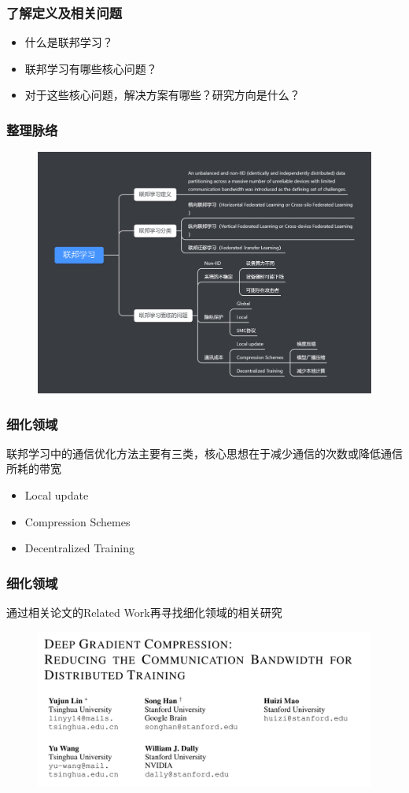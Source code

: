 \documentclass[hyperref={pdfpagelabels=false}]{beamer}
\begin{document}
\begin{frame}
	\frametitle{了解定义及相关问题}
	\begin{itemize}
		\item 什么是联邦学习？
		\item 联邦学习有哪些核心问题？
		\item 对于这些核心问题，解决方案有哪些？研究方向是什么？
	\end{itemize}
\end{frame}

\begin{frame}
	\frametitle{整理脉络}
	\begin{figure}
		\centering
		\includegraphics[height=0.8\textheight]{./figure/mubu.png}
	\end{figure}
\end{frame}

\begin{frame}
	\frametitle{细化领域}
	联邦学习中的通信优化方法主要有三类，核心思想在于减少通信的次数或降低通信所耗的带宽
	\begin{itemize}
		\item Local update
		\item Compression Schemes
		\item Decentralized Training
	\end{itemize}
\end{frame}

\begin{frame}
	\frametitle{细化领域}
	通过相关论文的Related Work再寻找细化领域的相关研究
	\begin{figure}
		\centering
		\includegraphics[height=0.6\textheight]{./figure/4.png}
	\end{figure}
\end{frame}
\end{document}

